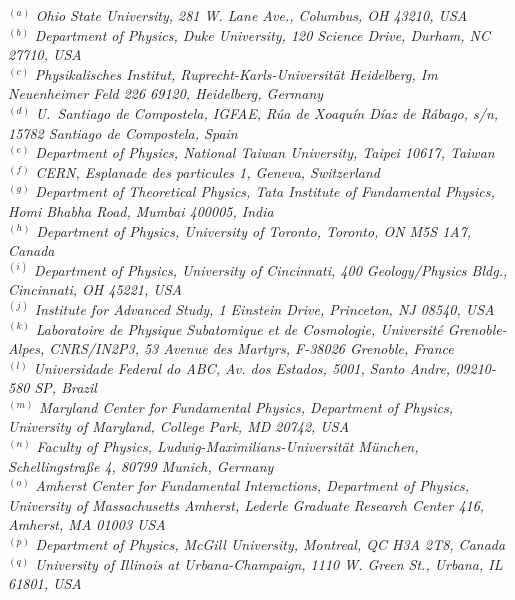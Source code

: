 {\footnotesize
\begin{center}
$^{(a)}$ \emph{Ohio State University, 281 W. Lane Ave., Columbus, OH 43210, USA}\\
$^{(b)}$ \emph{Department of Physics, Duke University, 120 Science Drive, Durham, NC 27710, USA}\\
$^{(c)}$ \emph{Physikalisches Institut, Ruprecht-Karls-Universit\"at Heidelberg, Im Neuenheimer Feld 226 69120, Heidelberg, Germany}\\
$^{(d)}$ \emph{U.~Santiago de Compostela, IGFAE, R\'ua de Xoaqu\'in D\'iaz de R\'abago, s/n, 15782 Santiago de Compostela, Spain}\\
$^{(e)}$ \emph{Department of Physics, National Taiwan University, Taipei 10617, Taiwan}\\
$^{(f)}$ \emph{CERN, Esplanade des particules 1, Geneva,  Switzerland}\\
$^{(g)}$ \emph{Department of Theoretical Physics, Tata Institute of Fundamental Physics,  Homi Bhabha Road, Mumbai 400005, India}\\
$^{(h)}$ \emph{Department of Physics, University of Toronto, Toronto, ON M5S 1A7, Canada}\\
$^{(i)}$ \emph{Department of Physics, University of Cincinnati, 400 Geology/Physics Bldg., Cincinnati, OH 45221, USA}\\
$^{(j)}$ \emph{Institute for Advanced Study, 1 Einstein Drive, Princeton, NJ 08540, USA}\\
$^{(k)}$ \emph{Laboratoire de Physique Subatomique et de Cosmologie, Universit\'e   Grenoble-Alpes, CNRS/IN2P3, 53 Avenue des Martyrs, F-38026 Grenoble, France}\\
$^{(l)}$ \emph{Universidade Federal do ABC, Av. dos Estados, 5001, Santo Andre, 09210-580 SP, Brazil}\\
$^{(m)}$ \emph{Maryland Center for Fundamental Physics,  Department of Physics, University of Maryland, College Park, MD 20742, USA}\\
$^{(n)}$ \emph{Faculty of Physics, Ludwig-Maximilians-Universit\"at M\"unchen, Schellingstra\ss e 4, 80799 Munich, Germany}\\
$^{(o)}$ \emph{Amherst Center for Fundamental Interactions, Department of Physics, University of Massachusetts Amherst, Lederle Graduate Research Center 416, Amherst, MA 01003 USA}\\
$^{(p)}$ \emph{Department of Physics, McGill University, Montreal, QC H3A 2T8, Canada}\\
$^{(q)}$ \emph{University of Illinois at Urbana-Champaign, 1110 W. Green St., Urbana, IL 61801, USA}\\

\end{center}}
